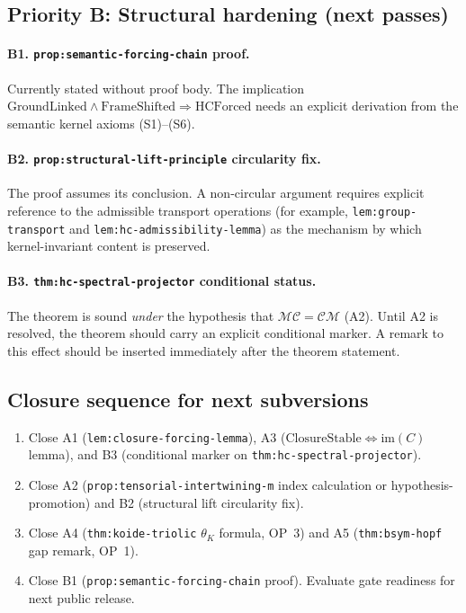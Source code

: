 \documentclass[12pt,a4paper]{article}
\begin{document}
\subsection*{Priority B: Structural hardening (next passes)}

\paragraph{B1. \texttt{prop:semantic-forcing-chain} proof.}
Currently stated without proof body. The implication
$\mathrm{GroundLinked} \wedge \mathrm{FrameShifted} \Rightarrow \mathrm{HCForced}$
needs an explicit derivation from the semantic kernel axioms (S1)--(S6).

\paragraph{B2. \texttt{prop:structural-lift-principle} circularity fix.}
The proof assumes its conclusion. A non-circular argument requires explicit
reference to the admissible transport operations (for example, \texttt{lem:group-transport} and \texttt{lem:hc-admissibility-lemma}) as the
mechanism by which kernel-invariant content is preserved.

\paragraph{B3. \texttt{thm:hc-spectral-projector} conditional status.}
The theorem is sound \emph{under} the hypothesis that
$\mathcal{M}\mathcal{C} = \mathcal{C}\mathcal{M}$ (A2). Until A2 is resolved,
the theorem should carry an explicit conditional marker. A remark to this
effect should be inserted immediately after the theorem statement.

\subsection*{Closure sequence for next subversions}

\begin{enumerate}[label=\textbf{v2.27.\arabic*:}, leftmargin=4em, start=6]
 \item Close A1 (\texttt{lem:closure-forcing-lemma}), A3
 ($\mathrm{ClosureStable} \Leftrightarrow \mathrm{im}(C)$ lemma),
 and B3 (conditional marker on \texttt{thm:hc-spectral-projector}).
 \item Close A2 (\texttt{prop:tensorial-intertwining-m} index calculation
 or hypothesis-promotion) and B2 (structural lift circularity fix).
 \item Close A4 (\texttt{thm:koide-triolic} $\theta_K$ formula, OP~3)
 and A5 (\texttt{thm:bsym-hopf} gap remark, OP~1).
 \item Close B1 (\texttt{prop:semantic-forcing-chain} proof).
 Evaluate gate readiness for next public release.
\end{enumerate}
\end{document}
